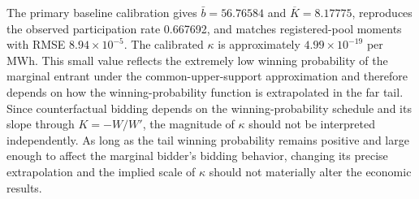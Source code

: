 \documentclass[10pt]{article}
\begin{document}
The primary baseline calibration gives $\bar b=56.76584$ and
$\overline K=8.17775$, reproduces the observed participation rate 0.667692,
and matches registered-pool moments with RMSE $8.94\times10^{-5}$.  The
calibrated $\kappa$ is approximately $4.99\times10^{-19}$ per MWh.  This small
value reflects the extremely low
winning probability of the marginal entrant under the common-upper-support
approximation and therefore depends on how the winning-probability function is
extrapolated in the far tail.  Since counterfactual bidding depends on the
winning-probability schedule and its slope through $K=-W/W'$, the magnitude of
$\kappa$ should not be interpreted independently.  As long as the tail winning
probability remains positive and large enough to affect the marginal bidder's
bidding behavior, changing its precise extrapolation and the implied scale of
$\kappa$ should not materially alter the economic results.
\end{document}

